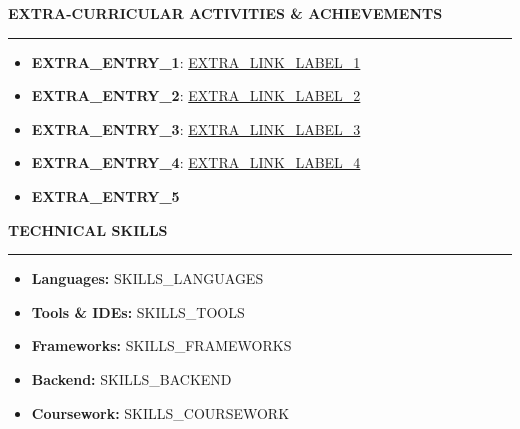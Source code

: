 \documentclass[10pt]{article}
\newcommand{\resheading}[1]{\vspace{6pt} \noindent \textbf{\large\scshape{#1}} \vspace{3pt} \hrule \vspace{4pt}}
\begin{document}
\resheading{EXTRA-CURRICULAR ACTIVITIES \& ACHIEVEMENTS}
\begin{itemize}
    \item \textbf{{{EXTRA_ENTRY_1}}}: \href{{{EXTRA_LINK_URL_1}}}{{{EXTRA_LINK_LABEL_1}}}
    \item \textbf{{{EXTRA_ENTRY_2}}}: \href{{{EXTRA_LINK_URL_2}}}{{{EXTRA_LINK_LABEL_2}}}
    \item \textbf{{{EXTRA_ENTRY_3}}}: \href{{{EXTRA_LINK_URL_3}}}{{{EXTRA_LINK_LABEL_3}}}
    \item \textbf{{{EXTRA_ENTRY_4}}}: \href{{{EXTRA_LINK_URL_4}}}{{{EXTRA_LINK_LABEL_4}}}
    \item \textbf{{{EXTRA_ENTRY_5}}}
\end{itemize}

\resheading{TECHNICAL SKILLS}
\begin{itemize}
\item \textbf{Languages:} {{SKILLS_LANGUAGES}}
\item \textbf{Tools \& IDEs:} {{SKILLS_TOOLS}}
\item \textbf{Frameworks:} {{SKILLS_FRAMEWORKS}}
\item \textbf{Backend:} {{SKILLS_BACKEND}}
\item \textbf{Coursework:} {{SKILLS_COURSEWORK}}
\end{itemize}
\end{document}
